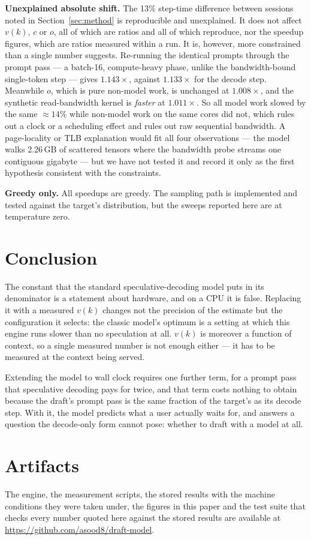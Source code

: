 \documentclass[conference]{IEEEtran}
\begin{document}
\textbf{Unexplained absolute shift.} The 13\% step-time difference between sessions noted in
Section~\ref{sec:method} is reproducible and unexplained. It does not affect $v(k)$, $c$ or $o$, all
of which are ratios and all of which reproduce, nor the speedup figures, which are ratios measured
within a run. It is, however, more constrained than a single number suggests. Re-running the
identical prompts through the prompt pass --- a batch-16, compute-heavy phase, unlike the
bandwidth-bound single-token step --- gives $1.143\times$, against $1.133\times$ for the decode step.
Meanwhile $o$, which is pure non-model work, is unchanged at $1.008\times$, and the synthetic
read-bandwidth kernel is \emph{faster} at $1.011\times$. So all model work slowed by the same
$\approx 14\%$ while non-model work on the same cores did not, which rules out a clock or a
scheduling effect and rules out raw sequential bandwidth. A page-locality or TLB explanation would
fit all four observations --- the model walks 2.26\,GB of scattered tensors where the bandwidth probe
streams one contiguous gigabyte --- but we have not tested it and record it only as the first
hypothesis consistent with the constraints.

\textbf{Greedy only.} All speedups are greedy. The sampling path is implemented and tested against the
target's distribution, but the sweeps reported here are at temperature zero.

\section{Conclusion}

The constant that the standard speculative-decoding model puts in its denominator is a statement about
hardware, and on a CPU it is false. Replacing it with a measured $v(k)$ changes not the precision of
the estimate but the configuration it selects: the classic model's optimum is a setting at which this
engine runs slower than no speculation at all. $v(k)$ is moreover a function of context, so a single
measured number is not enough either --- it has to be measured at the context being served.

Extending the model to wall clock requires one further term, for a prompt pass that speculative
decoding pays for twice, and that term costs nothing to obtain because the draft's prompt pass is the
same fraction of the target's as its decode step. With it, the model predicts what a user actually
waits for, and answers a question the decode-only form cannot pose: whether to draft with a model at
all.

\section*{Artifacts}

The engine, the measurement scripts, the stored results with the machine conditions they were taken
under, the figures in this paper and the test suite that checks every number quoted here against the
stored results are available at \url{https://github.com/asood8/draft-model}.



\end{document}
